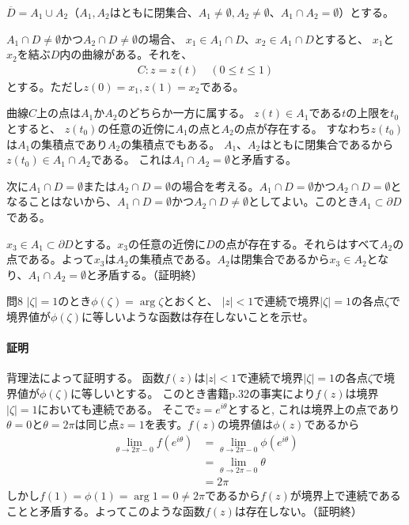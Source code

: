 $\overline{D}=A_1\cup A_2$（$A_1, A_2$はともに閉集合、$A_1\neq\emptyset, A_2\neq\emptyset$、$A_1\cap A_2=\emptyset$）とする。

$A_1\cap D\neq\emptyset$かつ$A_2\cap D\neq\emptyset$の場合、
$x_1\in A_1\cap D$、$x_2\in A_1\cap D$とすると、
$x_1$と$x_2$を結ぶ$D$内の曲線がある。それを、
\begin{align*}
    C\colon z=z(t)\quad (0\le t \le 1)
\end{align*}
とする。ただし$z(0)=x_1, z(1)=x_2$である。

曲線$C$上の点は$A_1$か$A_2$のどちらか一方に属する。
$z(t)\in A_1$である$t$の上限を$t_0$とすると、
$z(t_0)$の任意の近傍に$A_1$の点と$A_2$の点が存在する。
すなわち$z(t_0)$は$A_1$の集積点であり$A_2$の集積点でもある。
$A_1$、$A_2$はともに閉集合であるから$z(t_0)\in A_1\cap A_2$である。
これは$A_1\cap A_2=\emptyset$と矛盾する。

次に$A_1\cap D=\emptyset$または$A_2\cap D=\emptyset$の場合を考える。$A_1\cap D=\emptyset$かつ$A_2\cap D=\emptyset$となることはないから、$A_1\cap D=\emptyset$かつ$A_2\cap D\neq\emptyset$としてよい。このとき$A_1\subset\partial D$である。

$x_3\in A_1\subset\partial D$とする。$x_3$の任意の近傍に$D$の点が存在する。それらはすべて$A_2$の点である。よって$x_3$は$A_2$の集積点である。$A_2$は閉集合であるから$x_3\in A_2$となり、$A_1\cap A_2=\emptyset$と矛盾する。（証明終）

\begin{mysimplebox}{問8}
    $|\zeta|=1$のとき$\phi(\zeta)=\arg \zeta$とおくと、
    $|z|<1$で連続で境界$|\zeta|=1$の各点$\zeta$で境界値が$\phi(\zeta)$に等しいような函数は存在しないことを示せ。
\end{mysimplebox}
\paragraph{証明}
背理法によって証明する。
函数$f(z)$は$|z|<1$で連続で境界$|\zeta|=1$の各点$\zeta$で境界値が$\phi(\zeta)$に等しいとする。
このとき書籍p.32の事実により$f(z)$は境界$|\zeta|=1$においても連続である。
そこで$z=e^{i\theta}$とすると,
これは境界上の点であり$\theta=0$と$\theta=2\pi$は同じ点$z=1$を表す。$f(z)$の境界値は$\phi(z)$であるから
\begin{align*}
    \lim_{\theta\to 2\pi-0}f(e^{i\theta})
    &=\lim_{\theta\to 2\pi-0}\phi(e^{i\theta})\\
    &=\lim_{\theta\to 2\pi-0}\theta\\
    &=2\pi
\end{align*}
しかし$f(1)=\phi(1)=\arg 1=0\neq 2\pi$であるから$f(z)$が境界上で連続であることと矛盾する。よってこのような函数$f(z)$は存在しない。（証明終）

